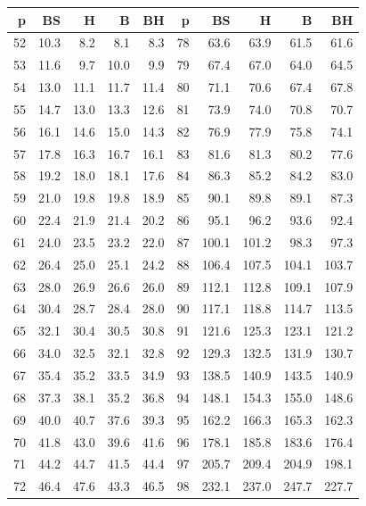 \documentclass[a4paper,10pt,titlepage,oneside,openany]{book}
\theoremstyle{plain}
\theoremstyle{definition}
\theoremstyle{remark}
\begin{document}
\begin{table}[p]
\centering
\fontsize{7.4}{8.4}\selectfont
\setlength{\tabcolsep}{3.2pt}
\begin{tabular}{@{}rrrrr@{\hspace{8mm}}rrrrr@{}}
\toprule
p & BS & H & B & BH & p & BS & H & B & BH \\
\midrule
52 & 10.3 & 8.2 & 8.1 & 8.3 & 78 & 63.6 & 63.9 & 61.5 & 61.6 \\
53 & 11.6 & 9.7 & 10.0 & 9.9 & 79 & 67.4 & 67.0 & 64.0 & 64.5 \\
54 & 13.0 & 11.1 & 11.7 & 11.4 & 80 & 71.1 & 70.6 & 67.4 & 67.8 \\
55 & 14.7 & 13.0 & 13.3 & 12.6 & 81 & 73.9 & 74.0 & 70.8 & 70.7 \\
56 & 16.1 & 14.6 & 15.0 & 14.3 & 82 & 76.9 & 77.9 & 75.8 & 74.1 \\
57 & 17.8 & 16.3 & 16.7 & 16.1 & 83 & 81.6 & 81.3 & 80.2 & 77.6 \\
58 & 19.2 & 18.0 & 18.1 & 17.6 & 84 & 86.3 & 85.2 & 84.2 & 83.0 \\
59 & 21.0 & 19.8 & 19.8 & 18.9 & 85 & 90.1 & 89.8 & 89.1 & 87.3 \\
60 & 22.4 & 21.9 & 21.4 & 20.2 & 86 & 95.1 & 96.2 & 93.6 & 92.4 \\
61 & 24.0 & 23.5 & 23.2 & 22.0 & 87 & 100.1 & 101.2 & 98.3 & 97.3 \\
62 & 26.4 & 25.0 & 25.1 & 24.2 & 88 & 106.4 & 107.5 & 104.1 & 103.7 \\
63 & 28.0 & 26.9 & 26.6 & 26.0 & 89 & 112.1 & 112.8 & 109.1 & 107.9 \\
64 & 30.4 & 28.7 & 28.4 & 28.0 & 90 & 117.1 & 118.8 & 114.7 & 113.5 \\
65 & 32.1 & 30.4 & 30.5 & 30.8 & 91 & 121.6 & 125.3 & 123.1 & 121.2 \\
66 & 34.0 & 32.5 & 32.1 & 32.8 & 92 & 129.3 & 132.5 & 131.9 & 130.7 \\
67 & 35.4 & 35.2 & 33.5 & 34.9 & 93 & 138.5 & 140.9 & 143.5 & 140.9 \\
68 & 37.3 & 38.1 & 35.2 & 36.8 & 94 & 148.1 & 154.3 & 155.0 & 148.6 \\
69 & 40.0 & 40.7 & 37.6 & 39.3 & 95 & 162.2 & 166.3 & 165.3 & 162.3 \\
70 & 41.8 & 43.0 & 39.6 & 41.6 & 96 & 178.1 & 185.8 & 183.6 & 176.4 \\
71 & 44.2 & 44.7 & 41.5 & 44.4 & 97 & 205.7 & 209.4 & 204.9 & 198.1 \\
72 & 46.4 & 47.6 & 43.3 & 46.5 & 98 & 232.1 & 237.0 & 247.7 & 227.7 \\

\end{tabular}
\end{table}
\end{document}
